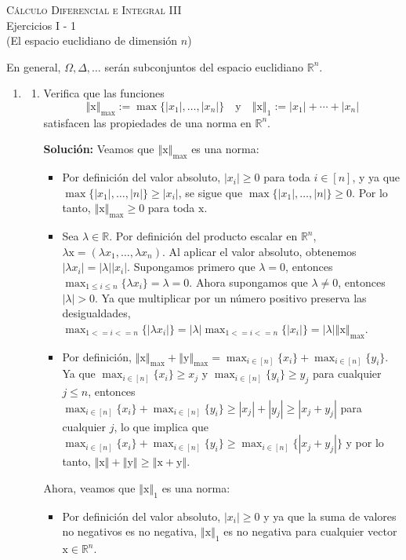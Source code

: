 \documentclass[12pt]{article}
\newcommand{\abs}[1]{\left\vert#1\right\vert}
\newcommand{\norm}[1]{\left\Vert#1\right\Vert}
\newcommand{\R}{\mathbb R}
\newcommand{\x}{\mathrm x}
\newcommand{\y}{\mathrm y}
\begin{document}
\pagestyle{empty}
\begin{center}
{\textsc{Cálculo Diferencial e Integral III} \\
\medskip 
\large{Ejercicios I - 1 \\
(El espacio euclidiano de dimensión $n$)}}
\end{center}
\bigskip

En general, $\Omega,\Delta, \dots$ serán subconjuntos del espacio euclidiano $\R^n$.

\begin{enumerate}

\item 
\begin{enumerate}[(1)]
\item Verifica que las funciones
\[ 
\norm{\x}_{\max} := \max\{\abs{x_1},\ldots,\abs{x_n}\} \quad \text{y}\quad 
\norm{\x}_1 := \abs{x_1} + \cdots + \abs{x_n} 
\]
satisfacen las propiedades de una norma en $\R^n$.

\textbf{Solución: } Veamos que \(\norm{\x}_{\max}\) es una norma:
    \begin{itemize}
        \item Por definición del valor absoluto, \(\abs{x_i} \geq 0\) para toda \(i \in [n]\), y ya que \(\max\{\abs{x_1}, \dots, \abs{n}\} \geq \abs{x_i}\), se sigue que \(\max\{\abs{x_1}, \dots, \abs{n}\} \geq 0\). Por lo tanto, \(\norm{\x}_{\max} \geq 0\) para toda \(\x\).
        \item Sea \(\lambda \in \R\). Por definición del producto escalar en \(\R^n\), \(\lambda \x = (\lambda x_1, \dots, \lambda x_n)\). Al aplicar el valor absoluto, obtenemos \(\abs{\lambda x_i} = \abs{\lambda} \abs{x_i}\). Supongamos primero que \(\lambda = 0\), entonces \(\max_{1 \leq i \leq n} \{\lambda x_i\} = \lambda = 0\). Ahora supongamos que \(\lambda \neq 0\), entonces \(\abs{\lambda} > 0\). Ya que multiplicar por un número positivo preserva las desigualdades, \(\max_{1 <= i <= n}\{\abs{\lambda x_i}\} = \abs{\lambda} \max_{1 <= i <= n}\{\abs{x_i}\} = \abs{\lambda} \norm{\x}_{\max}\).
        \item Por definición, \(\norm{\x}_{\max} + \norm{\y}_{\max} = \max_{i\in[n]}\{x_i\} + \max_{i\in[n]}\{y_i\}\). Ya que \(\max_{i\in[n]}\{x_i\} \geq x_j\) y \(\max_{i\in[n]}\{y_i\} \geq y_j\) para cualquier \(j \leq n\), entonces \(\max_{i\in[n]}\{x_i\} + \max_{i\in[n]}\{y_i\} \geq \abs{x_j} + \abs{y_j} \geq \abs{x_j + y_j}\) para cualquier \(j\), lo que implica que \(\max_{i\in[n]}\{x_i\} + \max_{i\in[n]}\{y_i\} \geq \max_{i \in [n]}\{\abs{x_j + y_j}\}\) y por lo tanto, \(\norm{\x} + \norm{\y} \geq \norm{\x + \y}\).
    \end{itemize}
Ahora, veamos que \(\norm{\x}_1\) es una norma:
\begin{itemize}
    \item Por definición del valor absoluto, \(\abs{x_i} \geq 0\) y ya que la suma de valores no negativos es no negativa, \(\norm{\x}_1\) es no negativa para cualquier vector \(\x \in \R^n\).
    

\end{itemize}
\end{enumerate}
\end{enumerate}
\end{document}
